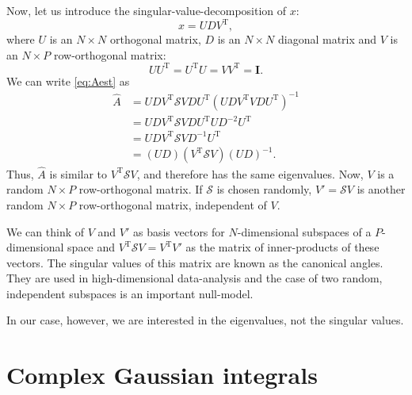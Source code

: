 \documentclass[12pt]{article}
\newcommand{\inv}{^{-1}}
\newcommand{\trans}{^\mathrm{T}}
\newcommand{\I}{\mathbf{I}}
\newcommand{\shift}{\mathcal{S}}
\newcommand{\aest}{\hat{A}}
\begin{document}
Now, let us introduce the singular-value-decomposition of $x$:
%
\begin{equation}\label{eq:svd}
  x = UDV\trans,
\end{equation}
%
where $U$ is an $N\times N$ orthogonal matrix, $D$ is an $N\times N$ diagonal matrix and $V$ is an $N\times P$ row-orthogonal matrix:
%
\begin{equation}\label{eq:svdorth}
  UU\trans = U\trans U = VV\trans = \I.
\end{equation}
%
We can write \eqref{eq:Aest} as
%
\begin{equation}\label{eq:Aestsvd}
\begin{aligned}
  \aest &= UDV\trans\shift VDU\trans (UDV\trans VDU\trans)\inv \\
   &= UDV\trans\shift VDU\trans UD^{-2}U\trans \\
   &= UDV\trans\shift VD\inv U\trans \\
   &= (UD)(V\trans\shift V)(UD)\inv.
\end{aligned}
\end{equation}
%
Thus, $\aest$ is similar to $V\trans\shift V$, and therefore has the same eigenvalues.
Now, $V$ is a random $N\times P$ row-orthogonal matrix.
If $\shift$ is chosen randomly, $V'=\shift V$ is another random $N\times P$ row-orthogonal matrix, independent of $V$.

We can think of $V$ and $V'$ as basis vectors for $N$-dimensional subspaces of a $P$-dimensional space and $V\trans\shift V=V\trans V'$ as the matrix of inner-products of these vectors.
The singular values of this matrix are known as the canonical angles.
They are used in high-dimensional data-analysis and the case of two random, independent subspaces is an important null-model.

In our case, however, we are interested in the eigenvalues, not the singular values.



\startappendices

\section{Complex Gaussian integrals}\label{sec:compgauss}
\end{document}
